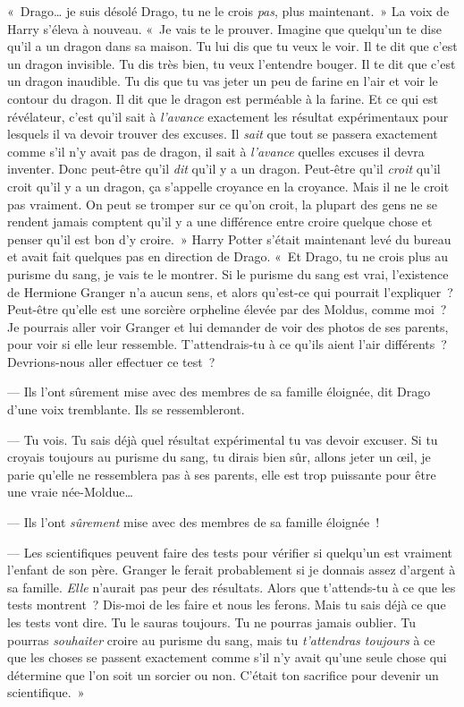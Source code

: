 «~Drago… je suis désolé Drago, tu ne le crois \emph{pas}, plus maintenant.~» La voix de Harry s'éleva à nouveau. «~Je vais te le prouver. Imagine que quelqu'un te dise qu'il a un dragon dans sa maison. Tu lui dis que tu veux le voir. Il te dit que c'est un dragon invisible. Tu dis très bien, tu veux l'entendre bouger. Il te dit que c'est un dragon inaudible. Tu dis que tu vas jeter un peu de farine en l'air et voir le contour du dragon. Il dit que le dragon est perméable à la farine. Et ce qui est révélateur, c'est qu'il sait à \emph{l'avance} exactement les résultat expérimentaux pour lesquels il va devoir trouver des excuses. Il \emph{sait} que tout se passera exactement comme s'il n'y avait pas de dragon, il sait à \emph{l'avance} quelles excuses il devra inventer. Donc peut-être qu'il \emph{dit} qu'il y a un dragon. Peut-être qu'il \emph{croit} qu'il croit qu'il y a un dragon, ça s'appelle croyance en la croyance. Mais il ne le croit pas vraiment. On peut se tromper sur ce qu'on croit, la plupart des gens ne se rendent jamais comptent qu'il y a une différence entre croire quelque chose et penser qu'il est bon d'y croire.~» Harry Potter s'était maintenant levé du bureau et avait fait quelques pas en direction de Drago. «~Et Drago, tu ne crois plus au purisme du sang, je vais te le montrer. Si le purisme du sang est vrai, l'existence de Hermione Granger n'a aucun sens, et alors qu'est-ce qui pourrait l'expliquer~? Peut-être qu'elle est une sorcière orpheline élevée par des Moldus, comme moi~? Je pourrais aller voir Granger et lui demander de voir des photos de ses parents, pour voir si elle leur ressemble. T'attendrais-tu à ce qu'ils aient l'air différents~? Devrions-nous aller effectuer ce test~?

--- Ils l'ont sûrement mise avec des membres de sa famille éloignée, dit Drago d’une voix tremblante. Ils se ressembleront.

--- Tu vois. Tu sais déjà quel résultat expérimental tu vas devoir excuser. Si tu croyais toujours au purisme du sang, tu dirais bien sûr, allons jeter un œil, je parie qu'elle ne ressemblera pas à ses parents, elle est trop puissante pour être une vraie née-Moldue…

--- Ils l'ont \emph{sûrement} mise avec des membres de sa famille éloignée~!

--- Les scientifiques peuvent faire des tests pour vérifier si quelqu'un est vraiment l'enfant de son père. Granger le ferait probablement si je donnais assez d'argent à sa famille. \emph{Elle} n'aurait pas peur des résultats. Alors que t'attends-tu à ce que les tests montrent~? Dis-moi de les faire et nous les ferons. Mais tu sais déjà ce que les tests vont dire. Tu le sauras toujours. Tu ne pourras jamais oublier. Tu pourras \emph{souhaiter} croire au purisme du sang, mais tu \emph{t'attendras toujours} à ce que les choses se passent exactement comme s'il n'y avait qu'une seule chose qui détermine que l'on soit un sorcier ou non. C'était ton sacrifice pour devenir un scientifique.~»

